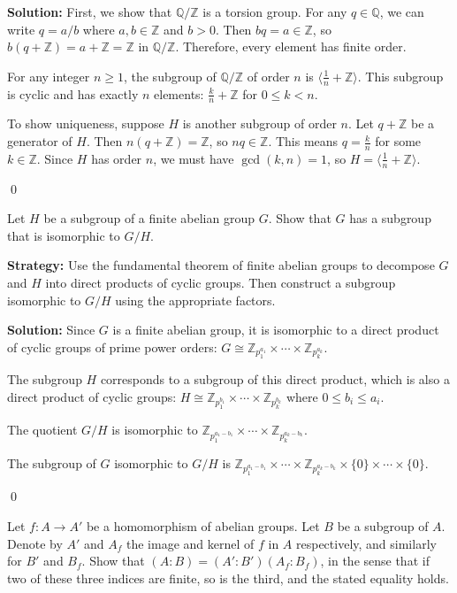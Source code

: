 \noindent\textbf{Solution:} First, we show that $\mathbb{Q}/\mathbb{Z}$ is a torsion group. For any $q \in \mathbb{Q}$, we can write $q = a/b$ where $a, b \in \mathbb{Z}$ and $b > 0$. Then $bq = a \in \mathbb{Z}$, so $b(q + \mathbb{Z}) = a + \mathbb{Z} = \mathbb{Z}$ in $\mathbb{Q}/\mathbb{Z}$. Therefore, every element has finite order.

For any integer $n \geq 1$, the subgroup of $\mathbb{Q}/\mathbb{Z}$ of order $n$ is $\langle \frac{1}{n} + \mathbb{Z} \rangle$. This subgroup is cyclic and has exactly $n$ elements: $\frac{k}{n} + \mathbb{Z}$ for $0 \leq k < n$.

To show uniqueness, suppose $H$ is another subgroup of order $n$. Let $q + \mathbb{Z}$ be a generator of $H$. Then $n(q + \mathbb{Z}) = \mathbb{Z}$, so $nq \in \mathbb{Z}$. This means $q = \frac{k}{n}$ for some $k \in \mathbb{Z}$. Since $H$ has order $n$, we must have $\gcd(k, n) = 1$, so $H = \langle \frac{1}{n} + \mathbb{Z} \rangle$.


\qed
\begin{problembox}
Let $H$ be a subgroup of a finite abelian group $G$. Show that $G$ has a subgroup that is isomorphic to $G/H$.
\end{problembox}

\noindent\textbf{Strategy:} Use the fundamental theorem of finite abelian groups to decompose $G$ and $H$ into direct products of cyclic groups. Then construct a subgroup isomorphic to $G/H$ using the appropriate factors.

\noindent\textbf{Solution:} Since $G$ is a finite abelian group, it is isomorphic to a direct product of cyclic groups of prime power orders: $G \cong \mathbb{Z}_{p_1^{a_1}} \times \cdots \times \mathbb{Z}_{p_k^{a_k}}$.

The subgroup $H$ corresponds to a subgroup of this direct product, which is also a direct product of cyclic groups: $H \cong \mathbb{Z}_{p_1^{b_1}} \times \cdots \times \mathbb{Z}_{p_k^{b_k}}$ where $0 \leq b_i \leq a_i$.

The quotient $G/H$ is isomorphic to $\mathbb{Z}_{p_1^{a_1-b_1}} \times \cdots \times \mathbb{Z}_{p_k^{a_k-b_k}}$.

The subgroup of $G$ isomorphic to $G/H$ is $\mathbb{Z}_{p_1^{a_1-b_1}} \times \cdots \times \mathbb{Z}_{p_k^{a_k-b_k}} \times \{0\} \times \cdots \times \{0\}$.


\qed
\begin{problembox}
Let $f: A \to A'$ be a homomorphism of abelian groups. Let $B$ be a subgroup of $A$. Denote by $A'$ and $A_f$ the image and kernel of $f$ in $A$ respectively, and similarly for $B'$ and $B_f$. Show that $(A : B) = (A' : B')(A_f : B_f)$, in the sense that if two of these three indices are finite, so is the third, and the stated equality holds.
\end{problembox}

